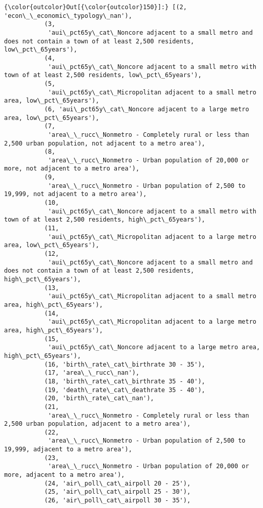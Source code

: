\documentclass[11pt]{article}
\begin{document}
\begin{Verbatim}[commandchars=\\\{\}]
{\color{outcolor}Out[{\color{outcolor}150}]:} [(2, 'econ\_\_economic\_typology\_nan'),
           (3,
            'aui\_pct65y\_cat\_Noncore adjacent to a small metro and does not contain a town of at least 2,500 residents, low\_pct\_65years'),
           (4,
            'aui\_pct65y\_cat\_Noncore adjacent to a small metro with town of at least 2,500 residents, low\_pct\_65years'),
           (5,
            'aui\_pct65y\_cat\_Micropolitan adjacent to a small metro area, low\_pct\_65years'),
           (6, 'aui\_pct65y\_cat\_Noncore adjacent to a large metro area, low\_pct\_65years'),
           (7,
            'area\_\_rucc\_Nonmetro - Completely rural or less than 2,500 urban population, not adjacent to a metro area'),
           (8,
            'area\_\_rucc\_Nonmetro - Urban population of 20,000 or more, not adjacent to a metro area'),
           (9,
            'area\_\_rucc\_Nonmetro - Urban population of 2,500 to 19,999, not adjacent to a metro area'),
           (10,
            'aui\_pct65y\_cat\_Noncore adjacent to a small metro with town of at least 2,500 residents, high\_pct\_65years'),
           (11,
            'aui\_pct65y\_cat\_Micropolitan adjacent to a large metro area, low\_pct\_65years'),
           (12,
            'aui\_pct65y\_cat\_Noncore adjacent to a small metro and does not contain a town of at least 2,500 residents, high\_pct\_65years'),
           (13,
            'aui\_pct65y\_cat\_Micropolitan adjacent to a small metro area, high\_pct\_65years'),
           (14,
            'aui\_pct65y\_cat\_Micropolitan adjacent to a large metro area, high\_pct\_65years'),
           (15,
            'aui\_pct65y\_cat\_Noncore adjacent to a large metro area, high\_pct\_65years'),
           (16, 'birth\_rate\_cat\_birthrate 30 - 35'),
           (17, 'area\_\_rucc\_nan'),
           (18, 'birth\_rate\_cat\_birthrate 35 - 40'),
           (19, 'death\_rate\_cat\_deathrate 35 - 40'),
           (20, 'birth\_rate\_cat\_nan'),
           (21,
            'area\_\_rucc\_Nonmetro - Completely rural or less than 2,500 urban population, adjacent to a metro area'),
           (22,
            'area\_\_rucc\_Nonmetro - Urban population of 2,500 to 19,999, adjacent to a metro area'),
           (23,
            'area\_\_rucc\_Nonmetro - Urban population of 20,000 or more, adjacent to a metro area'),
           (24, 'air\_poll\_cat\_airpoll 20 - 25'),
           (25, 'air\_poll\_cat\_airpoll 25 - 30'),
           (26, 'air\_poll\_cat\_airpoll 30 - 35'),

\end{Verbatim}
\end{document}
